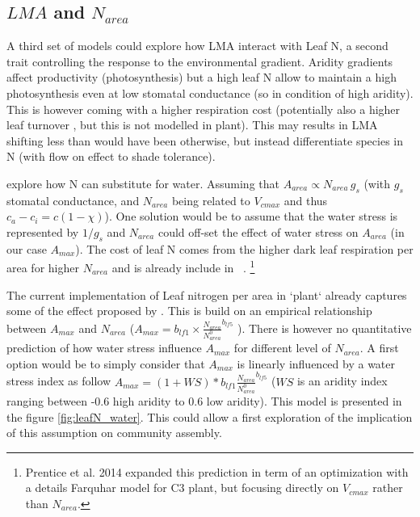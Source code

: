 \documentclass[a4paper,11pt]{article}
\begin{document}
\clearpage

\subsection{$LMA$ and $N_{area}$}

A third set of models could explore how LMA interact with Leaf N, a second trait controlling the response to the environmental gradient. Aridity gradients affect productivity (photosynthesis) but a
high leaf N allow to maintain a high photosynthesis even at low
stomatal conductance (so in condition of high aridity). This is
however coming with a higher respiration cost (potentially also a higher leaf turnover \citep{Wright-2002a,Wright-2002b}, but this is not modelled in plant). This may results in LMA shifting less than would have been otherwise, but instead differentiate species in N (with flow on effect to shade tolerance).


 \citet{Wright-2003} explore how N can substitute for water. Assuming that $A_{area} \propto N_{area} \, g_s$ (with $g_s$ stomatal conductance, and $N_{area}$ being related to $V_{cmax}$ and thus $c_a - c_i = c(1-\chi)$). One solution would be to assume that the water stress is represented by $1/g_s$ and $N_{area}$ could off-set the effect of water stress on $A_{area}$ (in our case $A_{max}$). The cost of leaf N comes from the higher dark leaf respiration per area for higher $N_{area}$ and is already include in \plant\ . \footnote{Prentice et al. 2014 expanded this prediction in term of an optimization with a details Farquhar model for C3 plant, but focusing directly on $V_{cmax}$ rather than $N_{area}$.}

 The current implementation of Leaf nitrogen per area in `plant` already captures some of the effect proposed by \citet{Wright-2003}. This is build on an empirical relationship between $A_{max}$ and $N_{area}$
($A_{max} = b_{lf1} \times \frac{N_{area}}{N^0_{area}}^{b_{lf5}}$ \citep{Falster-2016}). There is however no quantitative prediction of how water stress influence $A_{max}$ for different level of $N_{area}$. A first option would be to simply consider that $A_{max}$ is linearly influenced by a water stress index  as follow $A_{max} = (1+WS) * b_{lf1} \frac{N_{area}}{N^0_{area}}^{b_{lf5}}$ ($WS$ is an aridity index ranging between -0.6 high aridity to 0.6 low aridity). This model is presented in the figure \ref{fig:leafN_water}. This could allow a first exploration of the implication of this assumption on community assembly.
\end{document}
